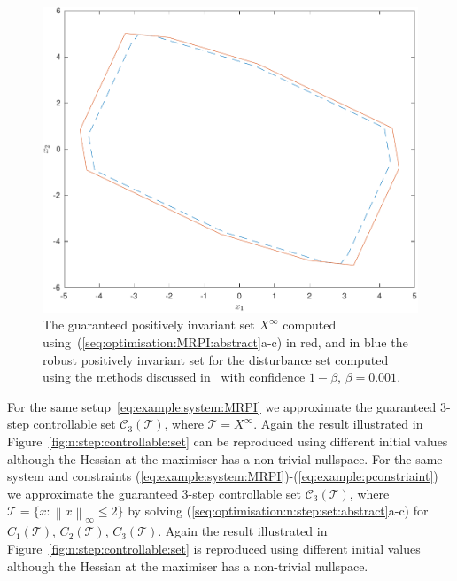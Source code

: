 \documentclass{ifacconf}
\providecommand{\norm}[1]{\left\|#1\right\|}
\providecommand{\C}{\mathscr C}
\providecommand{\T}{\mathcal T}
\begin{document}
\begin{figure}
\includegraphics[width=.95\linewidth]{MRPIsetOptimised.pdf}
\caption{The guaranteed positively invariant set $X^\infty$ computed using~(\ref{seq:optimisation:MRPI:abstract}a-c) 
in red, and in blue the robust positively invariant set for the disturbance set computed using the methods discussed in~\cite{Zhang2015} with 
confidence $1-\beta$, $\beta = 0.001$.}
\label{fig:MRPI:optimised}
\vspace{4mm}\end{figure}


For the same setup~\eqref{eq:example:system:MRPI} we approximate the guaranteed 3-step controllable set $\C_3(\T)$, where $\T=X^\infty$.
%
Again the result illustrated in Figure~\ref{fig:n:step:controllable:set} can be reproduced using different initial values although the Hessian at the maximiser has a non-trivial nullspace.
%
For the same system and constraints (\ref{eq:example:system:MRPI})-(\ref{eq:example:pconstriaint}) we approximate the guaranteed 3-step controllable set $\C_3(\T)$, where $\T=\{x:\norm{x}_\infty\leq 2\}$
%
by solving (\ref{seq:optimisation:n:step:set:abstract}a-c) for $C_1(\T)$, $C_2(\T)$, $C_3(\T)$.
%
Again the result illustrated in Figure~\ref{fig:n:step:controllable:set} is reproduced using different initial values although the Hessian at the maximiser has a non-trivial nullspace.
%
\end{document}
